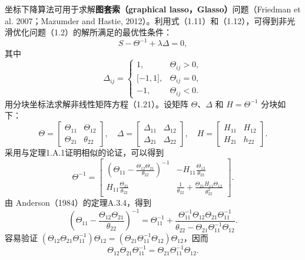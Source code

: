 坐标下降算法可用于求解\textbf{图套索（graphical lasso，Glasso）}问题（Friedman et al. 2007；Mazumder and Hastie, 2012）。利用式（1.11）和（1.12），可得到非光滑优化问题（1.2）的解所满足的最优性条件：
\begin{equation}
S-\Theta^{-1}+\lambda\Delta=0,
\tag{1.21}
\end{equation}
其中
\[
\Delta_{ij}=\begin{cases}1,&\Theta_{ij}>0,\\\lbrack-1,1\rbrack,&\Theta_{ij}=0,\\-1,&\Theta_{ij}<0.\end{cases}
\]
用分块坐标法求解非线性矩阵方程（1.21）。设矩阵 $\Theta$、$\Delta$ 和 $H=\Theta^{-1}$ 分块如下：
\[
\Theta=\begin{bmatrix}\Theta_{11}&\Theta_{12}\\\Theta_{21}&\theta_{22}\end{bmatrix},
\quad \Delta=\begin{bmatrix}\Delta_{11}&\Delta_{12}\\\Delta_{21}&\Delta_{22}\end{bmatrix},
\quad H=\begin{bmatrix}H_{11}&H_{12}\\H_{21}&h_{22}\end{bmatrix}.
\]
采用与定理1.A.1证明相似的论证，可以得到
\begin{equation}
\Theta^{-1}=\begin{bmatrix}
\displaystyle\left(\Theta_{11}-\frac{\Theta_{12}\Theta_{21}}{\theta_{22}}\right)^{-1}
&\displaystyle-H_{11}\frac{\Theta_{12}}{\theta_{22}}\\[1.2em]
\displaystyle H_{11}\frac{\Theta_{21}}{\theta_{22}}
&\displaystyle\frac1{\theta_{22}}+\frac{\Theta_{21}H_{11}\Theta_{12}}{\theta_{22}^2}
\end{bmatrix}.
\tag{1.22}
\end{equation}
由 Anderson（1984）的定理A.3.4，得到
\begin{equation}
\left(\Theta_{11}-\frac{\Theta_{12}\Theta_{21}}{\theta_{22}}\right)^{-1}
=\Theta_{11}^{-1}+\frac{\Theta_{11}^{-1}\Theta_{12}\Theta_{21}\Theta_{11}^{-1}}
{\theta_{22}-\Theta_{21}\Theta_{11}^{-1}\Theta_{12}}.
\tag{1.23}
\end{equation}
容易验证 $(\Theta_{12}\Theta_{21}\Theta_{11}^{-1})\Theta_{12}=(\Theta_{21}\Theta_{11}^{-1}\Theta_{12})\Theta_{12}$，因而
\begin{equation}
\Theta_{12}\Theta_{21}\Theta_{11}^{-1}=\Theta_{21}\Theta_{11}^{-1}\Theta_{12}.
\tag{1.24}
\end{equation}
